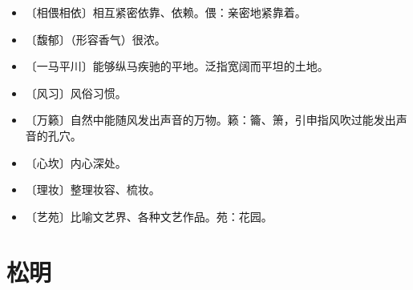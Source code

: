 \documentclass[12pt,UTF-8,openany]{ctexbook}
\begin{document}
\vspace{-1em}

\begin{itemize}
    \setlength\itemsep{-0.2em}
    \item 〔相偎相依〕相互紧密依靠、依赖。偎：亲密地紧靠着。
    \item 〔馥郁〕（形容香气）很浓。
    \item 〔一马平川〕能够纵马疾驰的平地。泛指宽阔而平坦的土地。
    \item 〔风习〕风俗习惯。
    \item 〔万籁〕自然中能随风发出声音的万物。籁：籥、箫，引申指风吹过能发出声音的孔穴。
    \item 〔心坎〕内心深处。
    \item 〔理妆〕整理妆容、梳妆。
    \item 〔艺苑〕比喻文艺界、各种文艺作品。苑：花园。
\end{itemize}

\chapter{松明}
\end{document}
